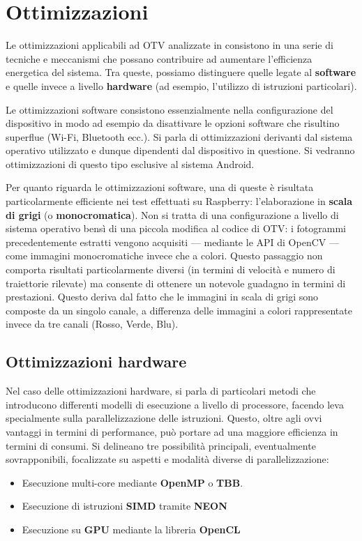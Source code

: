 \section{Ottimizzazioni}

Le ottimizzazioni applicabili ad OTV analizzate in \cite{rs12122047} consistono in una serie di tecniche e meccanismi che
possano contribuire ad aumentare l'efficienza energetica del sistema. %
Tra queste, possiamo distinguere quelle legate al \textbf{software} e quelle invece a livello \textbf{hardware} 
(ad esempio, l'utilizzo di istruzioni particolari).

Le ottimizzazioni software consistono essenzialmente nella configurazione del dispositivo in modo ad esempio
da disattivare le opzioni software che risultino superflue (Wi-Fi, Bluetooth ecc.). Si parla di ottimizzazioni derivanti dal
sistema operativo utilizzato e dunque dipendenti dal dispositivo in questione. Si vedranno ottimizzazioni di questo tipo
esclusive al sistema Android.

Per quanto riguarda le ottimizzazioni software, una di queste è risultata particolarmente efficiente nei test effettuati
su Raspberry: l'elaborazione in \textbf{scala di grigi} (o \textbf{monocromatica})\cite{app11157027}. Non si tratta di una configurazione
a livello di sistema operativo bensì di una piccola modifica al codice di OTV: i fotogrammi precedentemente estratti vengono
acquisiti --- mediante le API di OpenCV --- come immagini monocromatiche invece che a colori. Questo passaggio non comporta 
risultati particolarmente diversi (in termini di velocità e numero di traiettorie rilevate) ma consente di ottenere un 
notevole guadagno in termini di prestazioni. Questo deriva dal fatto che le immagini in scala di grigi
sono composte da un singolo canale, a differenza delle immagini a colori rappresentate invece da tre canali 
(Rosso, Verde, Blu).

\subsection{Ottimizzazioni hardware}

Nel caso delle ottimizzazioni hardware, si parla di particolari metodi che introducono differenti modelli di esecuzione
a livello di processore, facendo leva specialmente sulla parallelizzazione delle istruzioni. Questo, oltre agli ovvi vantaggi
in termini di performance, può portare ad una maggiore efficienza in termini di consumi.
Si delineano tre possibilità principali, eventualmente sovrapponibili, focalizzate su aspetti e modalità diverse di 
parallelizzazione:
\begin{itemize}
    \item Esecuzione multi-core mediante \textbf{OpenMP} o \textbf{TBB}. 
    \item Esecuzione di istruzioni \textbf{SIMD} tramite \textbf{NEON}
    \item Esecuzione su \textbf{GPU} mediante la libreria \textbf{OpenCL}
\end{itemize}

